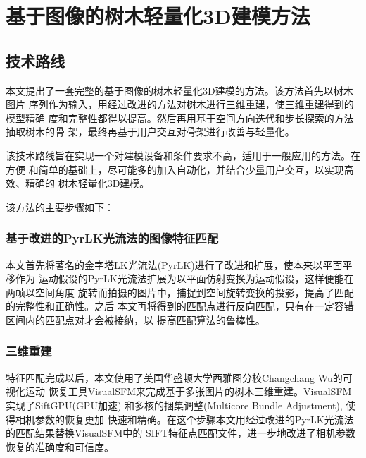 
\chapter{基于图像的树木轻量化3D建模方法}
\label{cha:techroute}

\section{技术路线}
\label{sec:techroute}
本文提出了一套完整的基于图像的树木轻量化3D建模的方法。该方法首先以树木图片
序列作为输入，用经过改进的方法对树木进行三维重建，使三维重建得到的模型精确
度和完整性都得以提高。然后再用基于空间方向迭代和步长探索的方法抽取树木的骨
架，最终再基于用户交互对骨架进行改善与轻量化。

该技术路线旨在实现一个对建模设备和条件要求不高，适用于一般应用的方法。在方便
和简单的基础上，尽可能多的加入自动化，并结合少量用户交互，以实现高效、精确的
树木轻量化3D建模。

该方法的主要步骤如下：

\subsection{基于改进的PyrLK光流法的图像特征匹配}
\label{subsec:match}
本文首先将著名的金字塔LK光流法(PyrLK)进行了改进和扩展，使本来以平面平移作为
运动假设的PyrLK光流法扩展为以平面仿射变换为运动假设，这样便能在两帧以空间角度
旋转而拍摄的图片中，捕捉到空间旋转变换的投影，提高了匹配的完整性和正确性。之后
本文再将得到的匹配点进行反向匹配，只有在一定容错区间内的匹配点对才会被接纳，以
提高匹配算法的鲁棒性。

\subsection{三维重建}
\label{subsec:calibration}
特征匹配完成以后，本文使用了美国华盛顿大学西雅图分校Changchang Wu的可视化运动
恢复工具VisualSFM来完成基于多张图片的树木三维重建。VisualSFM实现了SiftGPU(GPU加速)
和多核的捆集调整(Multicore Bundle Adjustment), 使得相机参数的恢复更加
快速和精确。在这个步骤本文用经过改进的PyrLK光流法的匹配结果替换VisualSFM中的
SIFT特征点匹配文件，进一步地改进了相机参数恢复的准确度和可信度。


